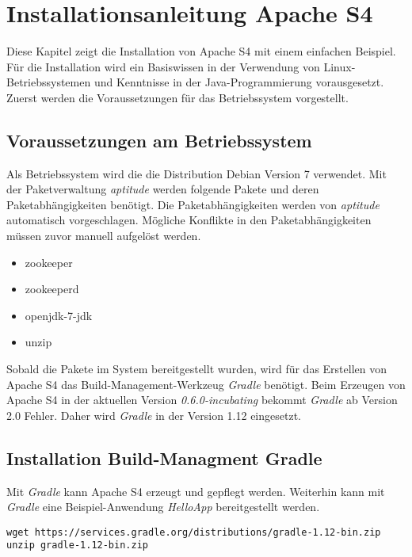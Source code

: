 \section{Installationsanleitung Apache S4}
\label{sec:s4install}

Diese Kapitel zeigt die Installation von Apache S4 mit einem einfachen Beispiel. Für die Installation wird ein Basiswissen in der Verwendung von Linux-Betriebssystemen und Kenntnisse in der Java-Programmierung vorausgesetzt. Zuerst werden die Voraussetzungen für das Betriebssystem vorgestellt.


\subsection{Voraussetzungen am Betriebssystem}

Als Betriebssystem wird die die Distribution Debian Version 7 verwendet. Mit der Paketverwaltung \textit{aptitude} werden folgende Pakete und deren Paketabhängigkeiten benötigt. Die Paketabhängigkeiten werden von \textit{aptitude} automatisch vorgeschlagen. Mögliche Konflikte in den Paketabhängigkeiten müssen zuvor manuell aufgelöst werden.

\begin{itemize}
	\item zookeeper
	\item zookeeperd
	\item openjdk-7-jdk
	\item unzip
\end{itemize}

Sobald die Pakete im System bereitgestellt wurden, wird für das Erstellen von Apache S4 das Build-Management-Werkzeug \textit{Gradle} benötigt. Beim Erzeugen von Apache S4 in der aktuellen Version \textit{0.6.0-incubating} bekommt \textit{Gradle} ab Version 2.0 Fehler. Daher wird \textit{Gradle} in der Version 1.12 eingesetzt.

\subsection{Installation Build-Managment Gradle}

Mit \textit{Gradle} kann Apache S4 erzeugt und gepflegt werden. Weiterhin kann mit \textit{Gradle} eine Beispiel-Anwendung \textit{HelloApp} bereitgestellt werden.

\begin{verbatim}
wget https://services.gradle.org/distributions/gradle-1.12-bin.zip
unzip gradle-1.12-bin.zip
\end{verbatim}


